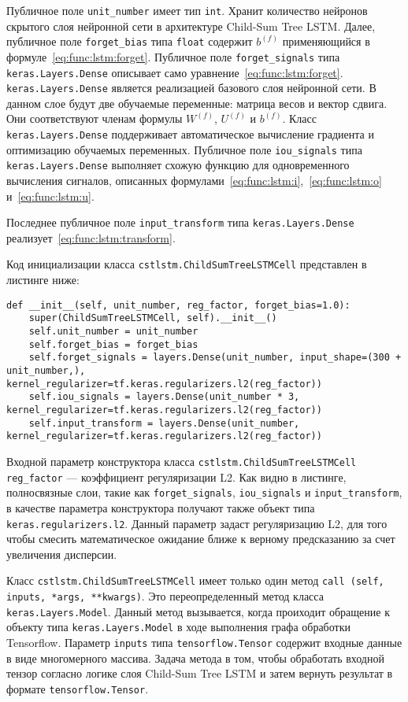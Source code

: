Публичное поле \texttt{unit\_number} имеет тип \texttt{int}. Хранит количество нейронов скрытого слоя нейронной сети в архитектуре Child-Sum Tree LSTM\@. Далее, публичное поле \texttt{forget\_bias} типа \texttt{float} содержит $b^{(f)}$ применяющийся в формуле~\ref{eq:func:lstm:forget}. Публичное поле \texttt{forget\_signals} типа \texttt{keras.Layers.Dense} описывает само уравнение~\ref{eq:func:lstm:forget}. \texttt{keras.Layers.Dense} является реализацией базового слоя нейронной сети. В данном слое будут две обучаемые переменные: матрица весов и вектор сдвига. Они соответствуют членам формулы $W^{(f)}$, $U^{(f)}$ и $b^{(f)}$. Класс \texttt{keras.Layers.Dense} поддерживает автоматическое вычисление градиента и оптимизацию обучаемых переменных. Публичное поле \texttt{iou\_signals} типа \texttt{keras.Layers.Dense} выполняет схожую функцию для одновременного вычисления сигналов, описанных формулами~\ref{eq:func:lstm:i},~\ref{eq:func:lstm:o} и~\ref{eq:func:lstm:u}.

Последнее публичное поле \texttt{input\_transform} типа \texttt{keras.Layers.Den\-se} реализует~\ref{eq:func:lstm:transform}.

Код инициализации класса \texttt{cstlstm.ChildSumTreeLSTMCell} представлен в листинге ниже:

\medskip
\begin{lstlisting}[style=Python]
  def __init__(self, unit_number, reg_factor, forget_bias=1.0):
    super(ChildSumTreeLSTMCell, self).__init__()
    self.unit_number = unit_number
    self.forget_bias = forget_bias
    self.forget_signals = layers.Dense(unit_number, input_shape=(300 + unit_number,), kernel_regularizer=tf.keras.regularizers.l2(reg_factor))
    self.iou_signals = layers.Dense(unit_number * 3, kernel_regularizer=tf.keras.regularizers.l2(reg_factor))
    self.input_transform = layers.Dense(unit_number, kernel_regularizer=tf.keras.regularizers.l2(reg_factor))
\end{lstlisting}
\medskip

Входной параметр конструктора класса \texttt{cstlstm.ChildSumTreeLSTM\-Cell} \texttt{reg\_factor} --- коэффициент регуляризации L2. Как видно в листинге, полносвязные слои, такие как \texttt{forget\_signals}, \texttt{iou\_signals} и \texttt{input\_trans\-form}, в качестве параметра конструктора получают также объект типа \texttt{ke\-ras.regularizers.l2}. Данный параметр задаст регуляризацию L2, для того чтобы смесить математическое ожидание ближе к верному предсказанию за счет увеличения дисперсии.

Класс \texttt{cstlstm.ChildSumTreeLSTMCell} имеет только один метод \texttt{call (self, inputs, *args, **kwargs)}. Это переопределенный метод класса \texttt{keras.Layers.Model}. Данный метод вызывается, когда проиходит обращение к объекту типа \texttt{keras.Layers.Model} в ходе выполнения графа обработки Tensorflow. Параметр \texttt{inputs} типа \texttt{tensorflow.Tensor} содержит входные данные в виде многомерного массива. Задача метода в том, чтобы обработать входной тензор согласно логике слоя Child-Sum Tree LSTM и затем вернуть результат в формате \texttt{tensorflow.Tensor}.

